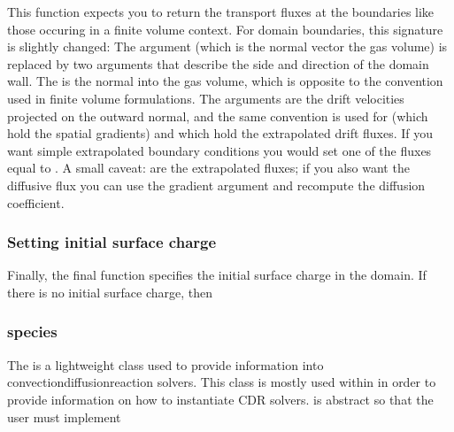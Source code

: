 \documentclass[letterpaper,10pt,english]{sphinxmanual}
\begin{document}
This function expects you to return the transport fluxes at the boundaries \sphinxhyphen{} like those occuring in a finite volume context. For domain boundaries, this signature is slightly changed: The argument  (which is the normal vector  the gas volume) is replaced by two arguments that describe the side and direction of the domain wall. The  is the normal into the gas volume, which is opposite to the convention used in finite volume formulations. The arguments  are the drift velocities projected on the outward normal, and the same convention is used for  (which hold the spatial gradients) and  which hold the extrapolated drift fluxes. If you want simple extrapolated boundary conditions you would set one of the fluxes equal to . A small caveat:  are the extrapolated  fluxes; if you also want the diffusive flux you can use the gradient argument and recompute the diffusion coefficient.


\subsubsection{Setting initial surface charge}
\label{\detokenize{MinimalPlasmaModel:setting-initial-surface-charge}}
Finally, the final function specifies the initial surface charge in the domain. If there is no initial surface charge, then

\begin{sphinxVerbatim}[commandchars=\\\{\},formatcom=\scriptsize]
        
                       
    
\end{sphinxVerbatim}


\subsubsection{species}
\label{\detokenize{MinimalPlasmaModel:species}}\label{\detokenize{MinimalPlasmaModel:chap-species}}
The {\hyperref[\detokenize{MinimalPlasmaModel:chap-species}]{}} is a lightweight class used to provide information into convection\sphinxhyphen{}diffusion\sphinxhyphen{}reaction solvers. This class is mostly used within {\hyperref[\detokenize{MinimalPlasmaModel:chap-cdr-plasma-physics}]{}} in order to provide information on how to instantiate CDR solvers. {\hyperref[\detokenize{MinimalPlasmaModel:chap-species}]{}} is abstract so that the user must implement
\end{document}
